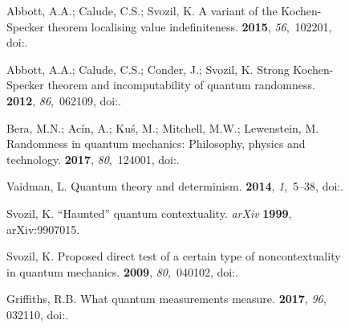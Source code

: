 \documentclass[entropy,article,accept,oneauthor,pdftex]{Definitions/mdpi}
\begin{document}
\begin{figure}[H]
\begin{thebibliography}{999}
Abbott, A.A.; Calude, C.S.; Svozil, K.
\newblock A variant of the {K}ochen-{S}pecker theorem localising value
  indefiniteness.
 {\bf 2015}, {\em 56},~102201, doi:{\href{https://doi.org/10.1063/1.4931658}{}}.

Abbott, A.A.; Calude, C.S.; Conder, J.; Svozil, K.
\newblock Strong {K}ochen-{S}pecker theorem and incomputability of quantum
  randomness.
 {\bf 2012}, {\em 86},~062109, doi:{\href{https://doi.org/10.1103/PhysRevA.86.062109}{}}.

Bera, M.N.; Ac\'in, A.; Ku{\'s}, M.; Mitchell, M.W.; Lewenstein, M.
\newblock Randomness in quantum mechanics: Philosophy, physics and technology.
 {\bf 2017}, {\em 80},~124001, doi:{\href{https://doi.org/10.1088/1361-6633/aa8731}{}}.


Vaidman, L.
\newblock Quantum theory and determinism.
 {\bf 2014}, {\em 1},~5--38, doi:{\href{https://doi.org/10.1007/s40509-014-0008-4}{}}.

Svozil, K.
\newblock ``{H}aunted'' quantum contextuality. \emph{arXiv} \textbf{1999}, arXiv:9907015.

Svozil, K.
\newblock Proposed direct test of a certain type of noncontextuality in quantum
  mechanics.
 {\bf 2009}, {\em 80},~040102, doi:{\href{https://doi.org/10.1103/PhysRevA.80.040102}{}}.

Griffiths, R.B.
\newblock What quantum measurements measure.
 {\bf 2017}, {\em 96}, 032110, doi:{\href{https://doi.org/10.1103/physreva.96.032110}{}}.


\end{thebibliography}
\end{figure}
\end{document}
